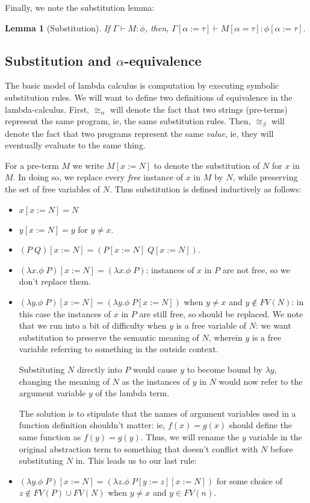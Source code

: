 \documentclass[12pt]{article}
\newtheorem{lemma}[theorem]{Lemma}
\begin{document}
Finally, we note the substitution lemma:
\begin{lemma}[Substitution]
If $\Gamma\vdash M:\phi$, then, $\Gamma[\alpha:=\tau]\vdash M[\alpha=\tau]:\phi[\alpha:=\tau].$
\end{lemma}

\subsection{Substitution and $\alpha$-equivalence}

The basic model of lambda calculus is computation by executing symbolic substitution rules. 
We will want to define two definitions of equivalence in the lambda-calculus. 
First, $\cong_\alpha$ will denote the fact that two strings (pre-terms) represent the same program,
ie, the same substitution rules.
Then, $\cong_\beta$ will denote the fact that two programs represent the same \textit{value}, 
ie, they will eventually evaluate to the same thing.

For a pre-term $M$ we write $M[x:=N]$ to denote the substitution of $N$ for $x$ in $M$. 
In doing so, we replace every \textit{free} instance of $x$ in $M$ by $N$, 
while preserving the set of free variables of $N$. 
Thus substitution is defined inductively as follows: 
\begin{itemize}
\item $x[x:=N] = N$
\item $y[x:=N] = y$ for $y\neq x$. 
\item $(P\; Q)[x:=N] = (P[x:=N]\; Q[x:=N])$.
\item $(\lambda x.\phi\; P)[x:=N] = (\lambda x.\phi\; P)$: instances of $x$ in $P$ are not free, so we don't replace them. 
\item $(\lambda y.\phi\; P)[x:=N] = (\lambda y.\phi\; P[x:=N])$ when $y\neq x$ and $y\notin FV(N)$: 
in this case the instances of $x$ in $P$ are still free, so should be replaced. 
We note that we run into a bit of difficulty when $y$ is a free variable of $N$: 
we want substitution to preserve the semantic meaning of $N$, 
wherein $y$ is a free variable referring to something in the outside context. 

Substituting $N$ directly into $P$ would cause $y$ to become bound by $\lambda y$, 
changing the meaning of $N$ as the instances of $y$ in $N$ would now refer to 
the argument variable $y$ of the lambda term. 

The solution is to stipulate that the names of argument variables used in a function definition
shouldn't matter: ie, $f(x) = g(x)$ should define the same function as $f(y) = g(y)$. 
Thus, we will rename the $y$ variable in the original abstraction term to something
that doesn't conflict with $N$ before substituting $N$ in. This leads us to our last rule: 
\item $(\lambda y.\phi\; P)[x:=N] = (\lambda z. \phi\; P[y:=z][x:=N])$ for some choice of $z\notin FV(P)\cup FV(N)$ when $y\neq x$ and $y\in FV(n)$. 
\end{itemize}
\end{document}
